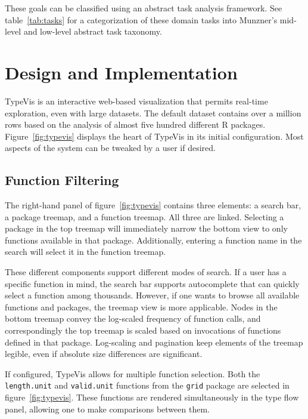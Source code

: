 \documentclass{vgtc}                          %
\begin{document}
These goals can be classified using an abstract task analysis framework.
See table~\ref{tab:tasks} for a categorization of these domain tasks
into Munzner's mid-level and low-level abstract task taxonomy. 


\section{Design and Implementation}

{\sc TypeVis} is an interactive web-based visualization
that permits real-time exploration,
even with large datasets.
The default dataset contains over a million rows
based on the analysis of almost five hundred
different R packages.
Figure~\ref{fig:typevis} displays
the heart of {\sc TypeVis}
in its initial configuration.
Most aspects of the system can be tweaked
by a user if desired.

\subsection{Function Filtering}

The right-hand panel of figure~\ref{fig:typevis}
contains three elements: a search bar,
a package treemap,
and a function treemap.
All three are linked.
Selecting a package
in the top treemap will immediately narrow the
bottom view to only functions available in that package.
Additionally, entering a function name in the search
will select it in the function treemap.

These different components support different modes of search.
If a user has a specific function in mind,
the search bar supports autocomplete
that can quickly select a function among thousands.
However, if one wants to browse
all available functions and packages,
the treemap view is more applicable.
Nodes in the bottom treemap convey the log-scaled
frequency of function calls,
and correspondingly the top treemap
is scaled based on invocations
of functions defined in that package.
Log-scaling and pagination keep
elements of the treemap legible,
even if absolute size differences are significant.

If configured, {\sc TypeVis} allows for multiple function selection.
Both the {\tt length.unit} and {\tt valid.unit} functions
from the {\tt grid} package are selected in figure~\ref{fig:typevis}.
These functions are rendered simultaneously in the type flow
panel, allowing one to make comparisons between them.
\end{document}
